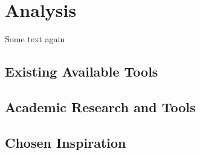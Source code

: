 \chapter{Analysis}
	Some text again

	\section{Existing Available Tools}
	\section{Academic Research and Tools}
	\section{Chosen Inspiration}
